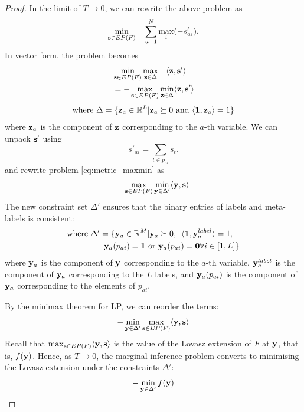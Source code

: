 {{{{{\begin{proof}
In the limit of $T \to 0$, we can rewrite the above problem as
\begin{equation}
    \min_{{\bf s} \in EP(F)} \quad \sum_{a = 1}^{N} \max_{i} (-s'_{ai}).
\end{equation}
In vector form, the problem becomes
\begin{align}
    &\min_{{\bf s} \in EP(F)} \max_{{\bf z} \in \Delta} - \langle {\bf z}, {\bf s'} \rangle \\
    & = - \max_{{\bf s} \in EP(F)} \min_{{\bf z} \in \Delta} \langle {\bf z}, {\bf s'} \rangle
\end{align}
\begin{equation}
    \text{where } \Delta = \{{\bf z}_a \in \mathbb{R}^L | {\bf z}_a \succeq 0  \textrm{ and } \langle {\bf 1}, {\bf z}_a \rangle = 1\}
\end{equation}
where ${\bf z}_a$ is the component of $\bf z$ corresponding to the $a$-th variable. We can unpack $\bf s'$ using 
\begin{equation}
s'_{ai} = \sum_{t \in p_{ai}} s_t.
\end{equation}
and rewrite problem \eqref{eq:metric_maxmin} as
\begin{align}
    - \max_{{\bf s} \in EP(F)} \min_{{\bf y} \in \Delta'} \langle {\bf y}, {\bf s} \rangle
\end{align}
The new constraint set $\Delta'$ ensures that the binary entries of labels and meta-labels is consistent:
\begin{align}
    \textrm{where } \Delta' &= \{ {\bf y}_a \in \mathbb{R}^M | {\bf y}_a \succeq 0, \enskip \langle {\bf 1}, {\bf y}_a^{label} \rangle = 1, \nonumber \\
    &\enskip {\bf y}_a(p_{ai}) = {\bf 1} \textrm{ or } {\bf y}_a(p_{ai}) = {\bf 0} \forall i \in [1, L]\}
\end{align} 
where ${\bf y}_a$ is the component of $\bf y$ corresponding to the $a$-th variable, ${\bf y}_a^{label}$  is the component of ${\bf y}_a$ corresponding to the $L$ labels, and ${\bf y}_a(p_{ai})$ is the component of ${\bf y}_a$ corresponding to the elements of $p_{ai}$. 

By the minimax theorem for LP, we can reorder the terms:
\begin{equation}
    - \min_{{\bf y} \in \Delta'} \max_{{\bf s} \in EP(F)} \langle {\bf y}, {\bf s} \rangle 
\end{equation}
Recall that $\max_{{\bf s} \in EP(F)} \langle {\bf y}, {\bf s} \rangle$ is the value of the Lovasz extension of $F$ at $\bf y$, that is, $f({\bf y})$. Hence, as $T \to 0$, the marginal inference problem converts to minimising the Lovasz extension under the constraints $\Delta'$:
\begin{equation}
    - \min_{{\bf y} \in \Delta'} f({\bf y}) 
\end{equation}
\end{proof}

}}}}}
